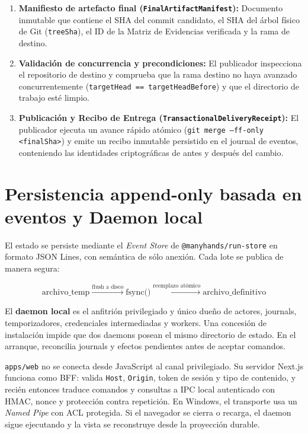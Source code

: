 \begin{enumerate}
  \item \textbf{Manifiesto de artefacto final (\texttt{FinalArtifactManifest}):} Documento inmutable que contiene el SHA del commit candidato, el SHA del árbol físico de Git (\texttt{treeSha}), el ID de la Matriz de Evidencias verificada y la rama de destino.
  \item \textbf{Validación de concurrencia y precondiciones:} El publicador inspecciona el repositorio de destino y comprueba que la rama destino no haya avanzado concurrentemente (\texttt{targetHead == targetHeadBefore}) y que el directorio de trabajo esté limpio.
  \item \textbf{Publicación y Recibo de Entrega (\texttt{TransactionalDeliveryReceipt}):} El publicador ejecuta un avance rápido atómico (\texttt{git merge --ff-only <finalSha>}) y emite un recibo inmutable persistido en el journal de eventos, conteniendo las identidades criptográficas de antes y después del cambio.
\end{enumerate}

\section{Persistencia append-only basada en eventos y Daemon local}

El estado se persiste mediante el \emph{Event Store} de
\texttt{@manyhands/run-store} en formato JSON Lines, con semántica de sólo
anexión. Cada lote se publica de manera segura:

\begin{equation}
\text{archivo\_temp} \xrightarrow{\text{flush a disco}} \text{fsync()} \xrightarrow{\text{reemplazo atómico}} \text{archivo\_definitivo}
\label{eq:atomic-write}
\end{equation}

El \textbf{daemon local} es el anfitrión privilegiado y único dueño de actores,
journals, temporizadores, credenciales intermediadas y workers. Una concesión de
instalación impide que dos daemons posean el mismo directorio de estado. En el
arranque, reconcilia journals y efectos pendientes antes de aceptar comandos.

\texttt{apps/web} no se conecta desde JavaScript al canal privilegiado. Su
servidor Next.js funciona como BFF: valida \texttt{Host}, \texttt{Origin}, token
de sesión y tipo de contenido, y recién entonces traduce comandos y consultas a
IPC local autenticado con HMAC, nonce y protección contra repetición. En
Windows, el transporte usa un \emph{Named Pipe} con ACL protegida. Si el
navegador se cierra o recarga, el daemon sigue ejecutando y la vista se
reconstruye desde la proyección durable.


